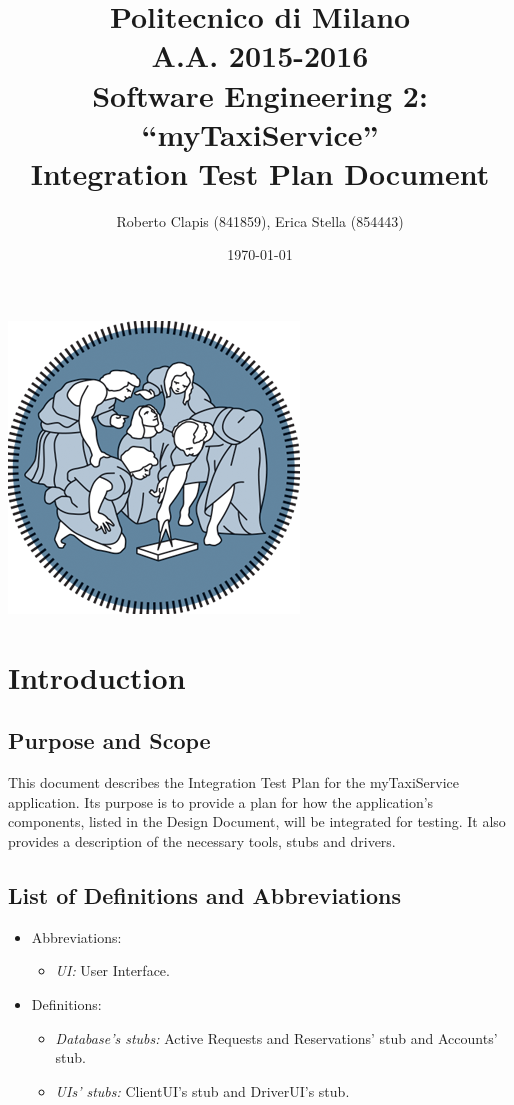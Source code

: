 \documentclass{article}
\author{Roberto Clapis (841859), Erica Stella (854443)}
\date{\today}
\title{Politecnico di Milano
	\\A.A. 2015\@-\@2016
	\\Software Engineering 2: ``myTaxiService''
	\\\textbf{I}ntegration \textbf{T}est \textbf{P}lan \textbf{D}ocument}
\begin{document}
\maketitle
\begin{center}
	\includegraphics{polimi-logo}
\end{center}
\clearpage
\tableofcontents
\clearpage
\section{Introduction}
\subsection{Purpose and Scope}
This document describes the Integration Test Plan for the myTaxiService application. Its purpose is to provide a plan for how the application's components, listed in the Design Document, will be integrated for testing. It also provides a description of the necessary tools, stubs and drivers. 
\subsection{List of Definitions and Abbreviations}
\begin{itemize}
	\item Abbreviations:
	\begin{itemize}
		\item \textit{UI:} User Interface.
	\end{itemize}
	\item Definitions:
	\begin{itemize}
		\item \textit{Database's stubs:} Active Requests and Reservations' stub 
		and Accounts' stub.
		\item \textit{UIs' stubs:} ClientUI's stub and DriverUI's stub.
	\end{itemize}
\end{itemize}
\end{document}
